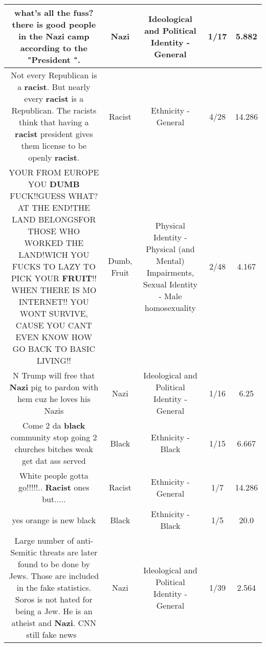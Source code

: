 \documentclass[11pt]{article}
\newlength\mylength
\begin{document}
\begin{center}
\begin{longtable}{|C{.65\mylength}|C{.30\mylength}|C{.12\mylength}|C{.12\mylength}|C{.12\mylength}|}
  \small what's all the fuss?  there is good people in the \textbf{Nazi} camp according to the "President ".\normalsize   & Nazi &  Ideological and Political Identity - General & 1/17 & 5.882 \\  \hline
  \small Not every Republican is a \textbf{racist}. But nearly every \textbf{racist} is a Republican. The racists think that having a \textbf{racist} president gives them license to be openly \textbf{racist}.\normalsize   & Racist & Ethnicity - General & 4/28 & 14.286 \\  \hline
  \small YOUR FROM EUROPE YOU \textbf{DUMB} FUCK!!GUESS WHAT?AT THE END!THE LAND BELONGSFOR THOSE WHO WORKED THE LAND!WICH YOU FUCKS TO LAZY TO PICK YOUR \textbf{FRUIT}!! WHEN THERE IS MO INTERNET!! YOU WONT SURVIVE, CAUSE YOU CANT EVEN KNOW HOW GO BACK TO BASIC LIVING!!\normalsize   & Dumb, Fruit & Physical Identity - Physical (and Mental) Impairments, Sexual Identity - Male homosexuality & 2/48 & 4.167 \\  \hline
  \small N Trump will free that \textbf{Nazi} pig to pardon with hem cuz he loves his Nazis\normalsize   & Nazi &  Ideological and Political Identity - General & 1/16 & 6.25 \\  \hline
  \small Come 2 da \textbf{black} community stop going 2 churches bitches weak get dat ass served\normalsize   & Black & Ethnicity - Black & 1/15 & 6.667 \\  \hline
  \small White people gotta go!!!!!.. \textbf{Racist} ones but.....\normalsize   & Racist & Ethnicity - General & 1/7 & 14.286 \\  \hline
  \small yes orange is new black\normalsize   & Black & Ethnicity - Black & 1/5 & 20.0 \\  \hline
  \small Large number of anti-Semitic threats are later found to be done by Jews. Those are included in the fake statistics. Soros is not hated for being a Jew. He is an atheist and \textbf{Nazi}. CNN still fake news 💩\normalsize   & Nazi &  Ideological and Political Identity - General & 1/39 & 2.564 \\  \hline

\end{longtable}
\end{center}
\end{document}
